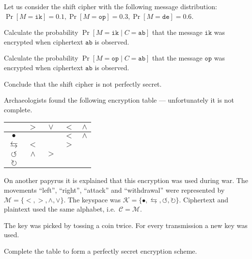 \documentclass[a4paper,10pt,landscape,twocolumn]{scrartcl}
\begin{document}
\begin{exercise}
Let us consider the shift cipher with the following message distribution: $\Pr[M = \mathtt{ik}]=0.1, \Pr[M = \mathtt{op}]=0.3, \Pr[M = \mathtt{de}]=0.6$. 
\begin{subex}
Calculate the probability $\Pr[M=\mathtt{ik} \mid C=\mathtt{ab}]$ that the message $\mathtt{ik}$ was encrypted when
 ciphertext $\mathtt{ab}$ is observed.
\end{subex}
\begin{subex}
Calculate the probability $\Pr[M=\mathtt{op} \mid C=\mathtt{ab}]$ that the message $\mathtt{op}$ was encrypted when
 ciphertext $\mathtt{ab}$ is observed.
\end{subex}
\begin{subex}
Conclude that the shift cipher is not perfectly secret.
\end{subex}
\end{exercise}


\begin{exercise}
Archaeologists found the following encryption table --- unfortunately it is not complete.
  \begin{center}
    \begin{tabular}{c||c|c|c|c}
      & $>$ & $\vee$ & $<$ & $\wedge$ \\
      \hline
      \hline
      $\bullet$ &  &  & $<$ & $\wedge$ \\
      \hline
      $\leftrightarrows$ & $<$ &  & $>$ &  \\
      \hline
      $\circlearrowleft$ & $\wedge$ & $>$ &  & \\
      \hline
      $\circlearrowright$ &  &  &  &  \\
    \end{tabular}
  \end{center}
  On another papyrus it is explained that this encryption was used during war.
  The movements ``left'', ``right'', ``attack'' and ``withdrawal'' were represented by $\mathcal{M} = \{<,>,\wedge,\vee\}$.
  The keyspace was $\mathcal{K} = \{\bullet,\leftrightarrows,\circlearrowleft, \circlearrowright\}$.
  Ciphertext and plaintext used the same alphabet, i.e.~$\mathcal{C} = \mathcal{M}$.

  The key was picked by tossing a coin twice.
  For every transmission a new key was used.

Complete the table to form a perfectly secret encryption scheme.
\end{exercise}
\end{document}
